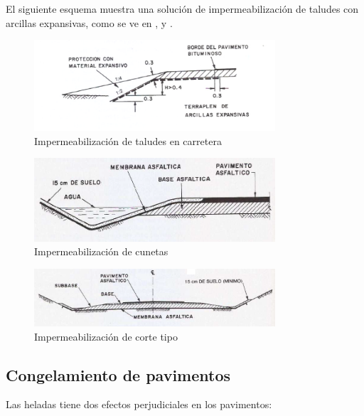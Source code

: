\documentclass[../main.tex]{subfiles}
\begin{document}
El siguiente esquema muestra una solución de impermeabilización de taludes con
arcillas expansivas, como se ve en , 
y .

\begin{figure}[ht]
  \centering
  \includegraphics[width=0.8\textwidth]{../images/20210422/arcillas_expansivas}
  \caption{Impermeabilización de taludes en carretera}
  \label{fig:arcillas_expansivas}
\end{figure}

\begin{figure}[ht]
  \centering
  \includegraphics[width=0.8\textwidth]{../images/20210422/arcillas_expansivas2}
  \caption{Impermeabilización de cunetas}
  \label{fig:arcillas_expansivas2}
\end{figure}

\begin{figure}[ht]
  \centering
  \includegraphics[width=0.8\textwidth]{../images/20210422/arcillas_expansivas3}
  \caption{Impermeabilización de corte tipo}
  \label{fig:arcillas_expansivas3}
\end{figure}

\subsection{Congelamiento de pavimentos}

Las heladas tiene dos efectos perjudiciales en los pavimentos:
\end{document}
